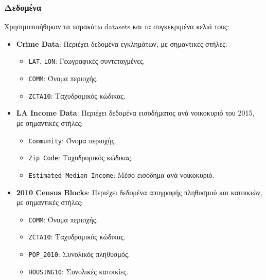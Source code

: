 \documentclass{article}
\begin{document}
\subsubsection*{Δεδομένα}
Χρησιμοποιήθηκαν τα παρακάτω datasets και τα συγκεκριμένα κελιά τους:
\begin{itemize}
    \item \textbf{Crime Data}: Περιέχει δεδομένα εγκλημάτων, με σημαντικές στήλες:
    \begin{itemize}
        \item \texttt{LAT}, \texttt{LON}: Γεωγραφικές συντεταγμένες.
        \item \texttt{COMM}: Όνομα περιοχής.
        \item \texttt{ZCTA10}: Ταχυδρομικός κώδικας.
    \end{itemize}
    \item \textbf{LA Income Data}: Περιέχει δεδομένα εισοδήματος ανά νοικοκυριό του 2015, με σημαντικές στήλες:
    \begin{itemize}
        \item \texttt{Community}: Όνομα περιοχής.
        \item \texttt{Zip Code}: Ταχυδρομικός κώδικας.
        \item \texttt{Estimated Median Income}: Μέσο εισόδημα ανά νοικοκυριό.
    \end{itemize}
    \item \textbf{2010 Census Blocks}: Περιέχει δεδομένα απογραφής πληθυσμού και κατοικιών, με σημαντικές στήλες:
    \begin{itemize}
        \item \texttt{COMM}: Όνομα περιοχής.
        \item \texttt{ZCTA10}: Ταχυδρομικός κώδικας.
        \item \texttt{POP\_2010}: Συνολικός πληθυσμός.
        \item \texttt{HOUSING10}: Συνολικές κατοικίες.
    \end{itemize}
\end{itemize}
\end{document}
